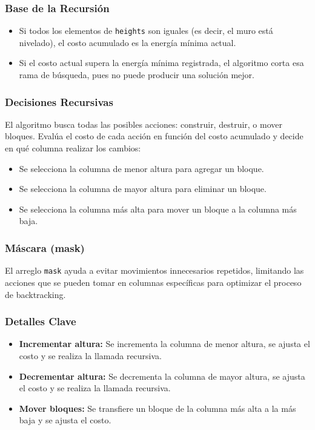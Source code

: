 \documentclass[a4paper,12pt]{article}
\begin{document}
\subsubsection{Base de la Recursión}
\begin{itemize}
	\item Si todos los elementos de \texttt{heights} son iguales (es decir, el muro está nivelado), el costo acumulado es la energía mínima actual.
	\item Si el costo actual supera la energía mínima registrada, el algoritmo corta esa rama de búsqueda, pues no puede producir una solución mejor.
\end{itemize}

\subsubsection{Decisiones Recursivas}
El algoritmo busca todas las posibles acciones: construir, destruir, o mover bloques. Evalúa el costo de cada acción en función del costo acumulado y decide en qué columna realizar los cambios:
\begin{itemize}
	\item Se selecciona la columna de menor altura para agregar un bloque.
	\item Se selecciona la columna de mayor altura para eliminar un bloque.
	\item Se selecciona la columna más alta para mover un bloque a la columna más baja.
\end{itemize}

\subsubsection{Máscara (mask)}
El arreglo \texttt{mask} ayuda a evitar movimientos innecesarios repetidos, limitando las acciones que se pueden tomar en columnas específicas para optimizar el proceso de backtracking.

\subsubsection{Detalles Clave}
\begin{itemize}
	\item \textbf{Incrementar altura:} Se incrementa la columna de menor altura, se ajusta el costo y se realiza la llamada recursiva.
	\item \textbf{Decrementar altura:} Se decrementa la columna de mayor altura, se ajusta el costo y se realiza la llamada recursiva.
	\item \textbf{Mover bloques:} Se transfiere un bloque de la columna más alta a la más baja y se ajusta el costo.
\end{itemize}
\end{document}
